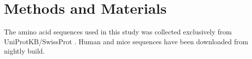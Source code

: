 \section{Methods and Materials}

The amino acid sequences used in this study was collected exclusively from UniProtKB/SwissProt \cite{Magrane:2011fv}. Human and mice sequences have been downloaded from nightly build. 